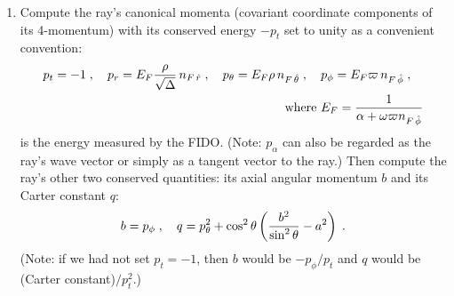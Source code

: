 \documentclass[12pt]{iopart}
\begin{document}
\begin{enumerate}
\item
Compute the ray's canonical momenta (covariant coordinate components of 
its 4-momentum) with its conserved energy $-p_t$ set to unity as a convenient convention:
\begin{eqnarray}
p_t =-1\;, \quad
p_r = E_F {\rho \over\sqrt{\Delta}} \,n_{F\,\hat r}\;, \quad
p_\theta = E_F \rho \,n_{F\,\hat\theta}\;, \quad
p_\phi = E_F \varpi \, n_{F\,\hat\phi}\;, \quad \nonumber \\
\textrm{where } E_F = {1\over \alpha+\omega\varpi n_{F\,\hat\phi}}
\label{eq:canonicalmomenta}
\end{eqnarray}
is the energy measured by the FIDO.
(Note: $p_\alpha$ can also be regarded as the ray's wave vector or simply
as a tangent vector to the ray.)  Then compute the
ray's other two conserved quantities: its axial angular momentum $b$ and its
Carter constant $q$:
\begin{equation}
b =  p_\phi\;, \quad
q = p_\theta^2 + \cos^2\theta\left({b^2\over\sin^2\theta} - a^2 \right) \;.
\label{eq:bq}
\end{equation}
(Note: if we had not set $p_t=-1$, then $b$ would be $-p_\phi/p_t$ and 
$q$ would be (Carter constant)$/p_t^2$.)


\end{enumerate}
\end{document}

